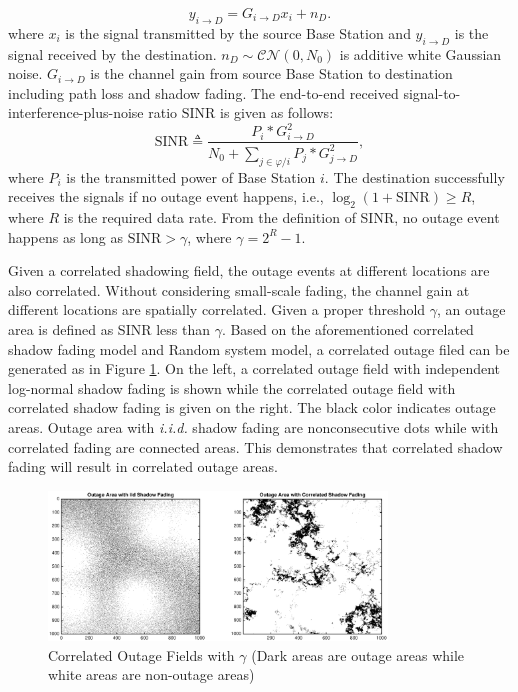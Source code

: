\documentclass[journal,comsoc]{IEEEtran}
\begin{document}
\begin{equation}
y_{i\to D} = G_{i\to D}x_{i}+n_{D}.
\end{equation}
where $x_{i}$ is the signal transmitted by the source Base Station and $y_{i\to D}$ is the signal received by the destination. $n_{D}\sim \mathcal{CN}(0,N_{0})$ is additive white Gaussian noise. $G_{i\to D}$ is the channel gain from source Base Station to destination including path loss and shadow fading. The end-to-end received signal-to-interference-plus-noise ratio $\text{SINR}$ is given as follows:
\begin{equation}
\text{SINR} \triangleq \frac{P_{i}*G_{i\to D}^{2}}{N_{0}+\sum_{j\in \varphi/i}P_{j}*G_{j\to D}^2},
\end{equation}
where $P_{i}$ is the transmitted power of Base Station $i$. The destination successfully receives the signals if no outage event happens, i.e., $\log_{2}(1+\text{SINR})\ge R$, where $R$ is the required data rate. From the definition of SINR, no outage event happens as long as $\text{SINR} > \gamma$, where $\gamma = 2^{R}-1$.
\par Given a correlated shadowing field, the outage events at different locations are also correlated. Without considering small-scale fading, the channel gain at different locations are spatially correlated. Given a proper threshold $\gamma$, an outage area is defined as SINR less than $\gamma$. Based on the aforementioned correlated shadow fading model and Random system model, a correlated outage filed can be generated as in Figure \ref{outagefie}. On the left, a correlated outage field with independent log-normal shadow fading is shown while the correlated outage field with correlated shadow fading is given on the right. The black color indicates outage areas. Outage area with \emph{i.i.d.} shadow fading are nonconsecutive dots while with correlated fading are connected areas. This demonstrates that correlated shadow fading will result in correlated outage areas.

\begin{figure}
\centering
\includegraphics[width=9cm]{outageArea.eps}
\caption{Correlated Outage Fields with $\gamma$ (Dark areas are outage areas while white areas are non-outage areas)}
\label{outagefie}
\end{figure}
\end{document}
